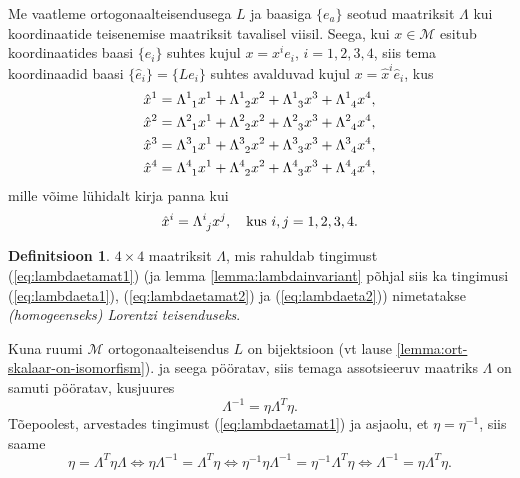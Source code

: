 \documentclass[12pt,a4paper,oneside]{article}
\theoremstyle{plain}
\theoremstyle{definition}
\newtheorem{definitsioon}{Definitsioon}[section]
\numberwithin{equation}{section}
\def\M{{\mathcal M}}
\begin{document}
Me vaatleme ortogonaalteisendusega $L$ ja baasiga $\{e_a\}$ seotud 
maatriksit $\Lambda$ kui koordinaatide teisenemise maatriksit 
tavalisel viisil. Seega, kui $x \in \M$ esitub koordinaatides 
baasi $\{e_i\}$ suhtes kujul $x = x^i e_i$, $i = 1, 2, 3, 4$, siis 
tema koordinaadid baasi $\{\hat{e}_i\} = \{Le_i\}$ suhtes avalduvad 
kujul $x = \hat{x}^i \hat{e}_i$, kus
\begin{align*}
\hat{x}^1 &= \Lambda\indices{^1_1} x^1 + \Lambda\indices{^1_2} x^2 + 
\Lambda\indices{^1_3} x^3 + \Lambda\indices{^1_4} x^4, \\
\hat{x}^2 &= \Lambda\indices{^2_1} x^1 + \Lambda\indices{^2_2} x^2 + 
\Lambda\indices{^2_3} x^3 + \Lambda\indices{^2_4} x^4, \\
\hat{x}^3 &= \Lambda\indices{^3_1} x^1 + \Lambda\indices{^3_2} x^2 + 
\Lambda\indices{^3_3} x^3 + \Lambda\indices{^3_4} x^4, \\
\hat{x}^4 &= \Lambda\indices{^4_1} x^1 + \Lambda\indices{^4_2} x^2 + 
\Lambda\indices{^4_3} x^3 + 
\Lambda\indices{^4_4} x^4,
\end{align*}
mille võime lühidalt kirja panna kui
\begin{equation*}
\hat{x}^i = \Lambda\indices{^i_j} x^j,\quad \text{kus}\ i,j=1, 2, 3, 4.
\end{equation*}

\begin{definitsioon}
$4 \times 4$ maatriksit $\Lambda$, mis rahuldab tingimust 
(\ref{eq:lambdaetamat1}) (ja lemma \ref{lemma:lambdainvariant} 
põhjal siis ka tingimusi (\ref{eq:lambdaeta1}), (\ref{eq:lambdaetamat2}) 
ja (\ref{eq:lambdaeta2})) nimetatakse \emph{(homogeenseks) Lorentzi 
teisenduseks}.
\end{definitsioon}

Kuna ruumi $\M$ ortogonaalteisendus $L$ on bijektsioon (vt 
lause \ref{lemma:ort-skalaar-on-isomorfism}).
ja seega pööratav, siis temaga assotsieeruv maatriks $\Lambda$ on 
samuti pööratav, kusjuures
\begin{equation} \label{eq:lambda-1lambda-trans}
\Lambda^{-1} = \eta \Lambda^T \eta.
\end{equation}
Tõepoolest, arvestades tingimust (\ref{eq:lambdaetamat1}) ja asjaolu, 
et $\eta = \eta^{-1}$, siis saame
\begin{equation*}
\eta = \Lambda^T \eta \Lambda \iff \eta \Lambda^{-1} = 
\Lambda^T \eta \iff \eta^{-1} \eta \Lambda^{-1} = 
\eta^{-1} \Lambda^T \eta \iff \Lambda^{-1} = \eta \Lambda^T \eta.
\end{equation*}
\end{document}
